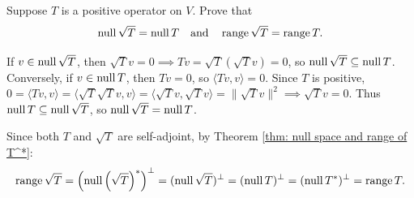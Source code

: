\begin{xrcs}
  Suppose $T$ is a positive operator on $V$. Prove that
  \begin{equation}
    \operatorname{null} \sqrt{T} = \operatorname{null} T \quad \text{and} \quad \operatorname{range} \sqrt{T} = \operatorname{range} T.
  \end{equation}

\begin{xprf}
  \StepOne If $v \in \operatorname{null} \sqrt{T}$, then $\sqrt{T}v = 0 \implies Tv = \sqrt{T}(\sqrt{T}v) = 0$, so $\operatorname{null} \sqrt{T} \subseteq \operatorname{null} T$.
  Conversely, if $v \in \operatorname{null} T$, then $Tv = 0$, so $\langle Tv, v \rangle = 0$.
  Since $T$ is positive, $0 = \langle Tv, v \rangle = \langle \sqrt{T}\sqrt{T}v, v \rangle = \langle \sqrt{T}v, \sqrt{T}v \rangle = \|\sqrt{T}v\|^2 \implies \sqrt{T}v = 0$.
  Thus $\operatorname{null} T \subseteq \operatorname{null} \sqrt{T}$, so $\operatorname{null} \sqrt{T} = \operatorname{null} T$.

  \StepTwo Since both $T$ and $\sqrt{T}$ are self-adjoint, by Theorem \ref{thm: null space and range of T^*}:
  \[
    \operatorname{range} \sqrt{T} = \left(\operatorname{null} \left(\sqrt{T}\right)^*\right)^\perp = (\operatorname{null} \sqrt{T})^\perp = (\operatorname{null} T)^\perp = (\operatorname{null} T^*)^\perp = \operatorname{range} T.
  \]
\end{xprf}
\end{xrcs}

